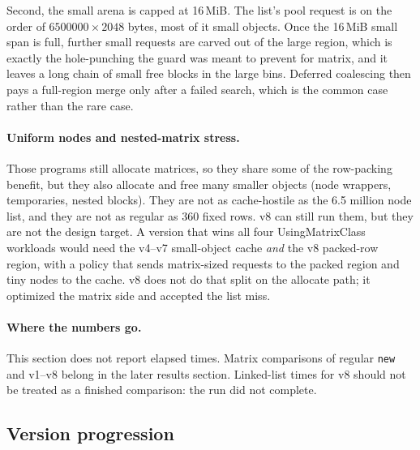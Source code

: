 Second, the small arena is capped at 16\,MiB.
The list's pool request is on the order of $6500000 \times 2048$ bytes, most
of it small objects.
Once the 16\,MiB small span is full, further small requests are carved out of
the large region, which is exactly the hole-punching the guard was meant to
prevent for matrix, and it leaves a long chain of small free blocks in the
large bins.
Deferred coalescing then pays a full-region merge only after a failed search,
which is the common case rather than the rare case.

\paragraph{Uniform nodes and nested-matrix stress.}
Those programs still allocate matrices, so they share some of the row-packing
benefit, but they also allocate and free many smaller objects (node wrappers,
temporaries, nested blocks).
They are not as cache-hostile as the 6.5 million node list, and they are not
as regular as 360 fixed rows.
v8 can still run them, but they are not the design target.
A version that wins all four UsingMatrixClass workloads would need the v4--v7
small-object cache \emph{and} the v8 packed-row region, with a policy that
sends matrix-sized requests to the packed region and tiny nodes to the cache.
v8 does not do that split on the allocate path; it optimized the matrix side
and accepted the list miss.

\paragraph{Where the numbers go.}
This section does not report elapsed times.
Matrix comparisons of regular \texttt{new} and v1--v8 belong in the later
results section.
Linked-list times for v8 should not be treated as a finished comparison: the
run did not complete.

\subsection{Version progression}

